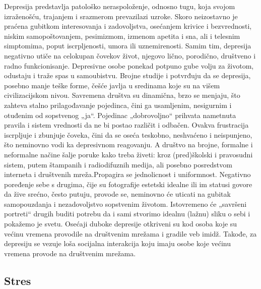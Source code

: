 \documentclass[a4paper]{article}
\begin{document}
{		
		Depresija predstavlja patološko neraspoloženje, odnosno tugu, koja svojom izraženošću, trajanjem i srazmerom prevazilazi uzroke. Skoro neizostavno je praćena gubitkom interesovanja i zadovoljstva, osećanjem krivice i bezvrednosti, niskim samopoštovanjem, pesimizmom, izmenom apetita i sna, ali i telesnim simptomima, poput iscrpljenosti, umora ili uznemirenosti. Samim tim, depresija negativno utiče na celokupan čovekov život, njegovo lično, porodično, društveno i radno funkcionisanje. Depresivne osobe ponekad potpuno gube volju za životom, odustaju i traže spas u samoubistvu.
		Brojne studije i potvrđuju da se depresija, posebno manje teške forme, češće javlja u sredinama koje su na višem civilizacijskom nivou.  Savremena društva su dinamična, brzo se menjaju, što zahteva stalno prilagođavanje pojedinca, čini ga usamljenim, nesigurnim  i otuđenim od sopstvenog „ja“. Pojedinac „dobrovoljno“ prihvata nametnuta pravila i sistem vrednosti da ne bi postao različit i odbačen. Ovakva frustracija iscrpljuje i zbunjuje čoveka, čini da se oseća teskobno, neshvaćeno i neispunjeno, što neminovno vodi ka depresivnom reagovanju. A društvo na brojne, formalne i neformalne načine šalje poruke kako treba živeti: kroz (pred)školski i pravosudni sistem, putem štampanih i radiodifuznih medija, ali posebno posredstvom interneta i društvenih mreža.Propagira se jednolicnost i uniformnost. Negativno poređenje sebe s drugima, čije su fotografije estetski idealne ili im statusi govore da žive srećno, često putuju, provode se, neminovno će uticati na gubitak samopouzdanja i nezadovoljstvo sopstvenim životom. Istovremeno će „savršeni portreti“ drugih buditi potrebu da i sami stvorimo idealnu (lažnu) sliku o sebi i pokažemo je svetu. Osećaji duboke depresije otkriveni su kod osoba koje su većinu vremena provodile na društvenim mrežama i gradile veb imidž. Takođe, za depresiju se vezuje loša socijalna interakcija koju imaju osobe koje većinu vremena provode na društvenim mrežama.
		
		\subsection{Stres}
		
}
\end{document}
